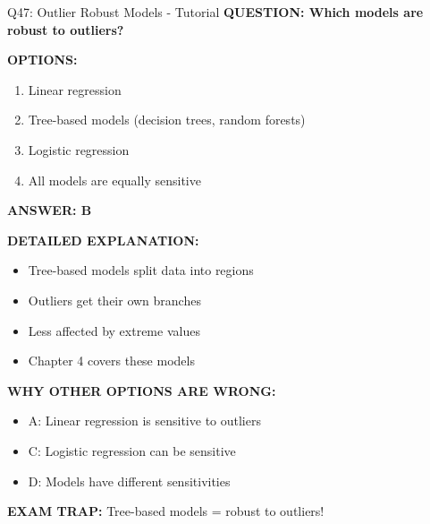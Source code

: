 \documentclass[8pt]{beamer}
\begin{document}
	\begin{frame}{Q47: Outlier Robust Models - Tutorial}
		\fontsize{6.5}{7.5}\selectfont
		\textbf{QUESTION: Which models are robust to outliers?}
		
		\vspace{0.1cm}
		\textbf{OPTIONS:}
		\begin{enumerate}
			\item Linear regression
			\item Tree-based models (decision trees, random forests)
			\item Logistic regression
			\item All models are equally sensitive
		\end{enumerate}
		
		\vspace{0.1cm}
		\textcolor{myblue}{\textbf{ANSWER: B}}
		
		\vspace{0.1cm}
		\textbf{DETAILED EXPLANATION:}
		\begin{itemize}
			\item Tree-based models split data into regions
			\item Outliers get their own branches
			\item Less affected by extreme values
			\item Chapter 4 covers these models
		\end{itemize}
		
		\vspace{0.1cm}
		\textcolor{myred}{\textbf{WHY OTHER OPTIONS ARE WRONG:}}
		\begin{itemize}
			\item \textcolor{myred}{A:} Linear regression is sensitive to outliers
			\item \textcolor{myred}{C:} Logistic regression can be sensitive
			\item \textcolor{myred}{D:} Models have different sensitivities
		\end{itemize}
		
		\textcolor{myred}{\textbf{EXAM TRAP:}} Tree-based models = \textcolor{myblue}{robust to outliers}!
	\end{frame}
	
\end{document}
